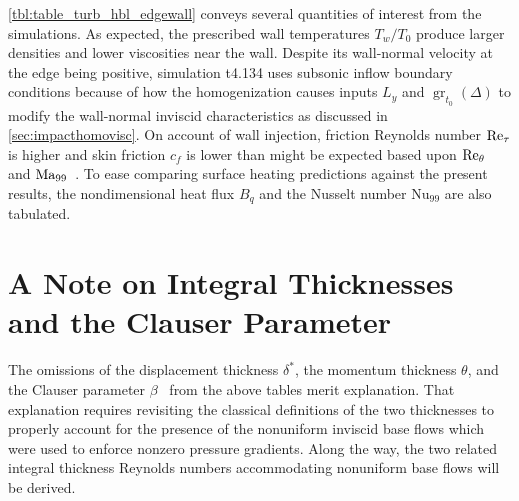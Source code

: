 \autoref{tbl:table_turb_hbl_edgewall} conveys several quantities of interest
from the simulations.  As expected, the prescribed wall temperatures $T_w/T_0$
produce larger densities and lower viscosities near the wall.
%
Despite its wall-normal velocity at the edge being positive, simulation t4.134
uses subsonic inflow boundary conditions because of how the homogenization
causes inputs $L_y$ and $\operatorname{gr}_{t_0}\!\left(\Delta\right)$ to modify
the wall-normal inviscid characteristics as discussed in
\autoref{sec:impacthomovisc}.
%
On account of wall injection, friction Reynolds
number $\Reynolds[\tau]{}$ is higher and skin friction $c_f$ is lower than
might be expected based upon $\Reynolds[\theta]{}$ and
$\Mach[99]{}$~\citep{Sumitani1995Direct, Smits2005Turbulent}.  To ease
comparing surface heating predictions against the present results, the
nondimensional heat flux $B_q$ and the Nusselt number $\textrm{Nu}_{99}$
are also tabulated.

\section{A Note on Integral Thicknesses and the Clauser Parameter}
\label{sec:bldata_integrallengths}

The omissions of the displacement thickness $\delta^\ast$, the momentum
thickness $\theta$, and the Clauser parameter
$\beta$~\citep{Clauser1954Turbulent} from the above tables merit explanation.
That explanation requires revisiting the classical definitions of the two
thicknesses to properly account for the presence of the nonuniform inviscid
base flows which were used to enforce nonzero pressure gradients.  Along the
way, the two related integral thickness Reynolds numbers accommodating
nonuniform base flows will be derived.

